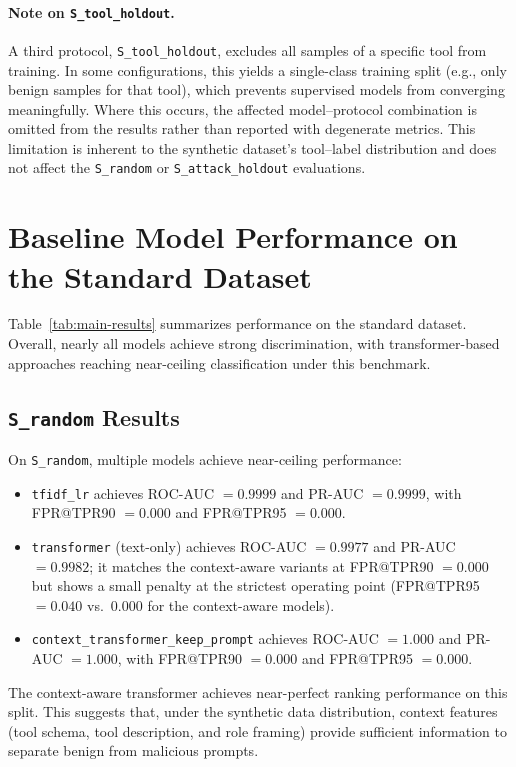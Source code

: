 \paragraph{Note on \texttt{S\_tool\_holdout}.}
A third protocol, \texttt{S\_tool\_holdout}, excludes all samples of a specific tool from training. In some configurations, this yields a single-class training split (e.g., only benign samples for that tool), which prevents supervised models from converging meaningfully. Where this occurs, the affected model--protocol combination is omitted from the results rather than reported with degenerate metrics. This limitation is inherent to the synthetic dataset's tool--label distribution and does not affect the \texttt{S\_random} or \texttt{S\_attack\_holdout} evaluations.

\section{Baseline Model Performance on the Standard Dataset}
\label{subsec:baseline_standard}

Table~\ref{tab:main-results} summarizes performance on the standard dataset. Overall, nearly all models achieve strong discrimination, with transformer-based approaches reaching near-ceiling classification under this benchmark.

\subsection{\texttt{S\_random} Results}

On \texttt{S\_random}, multiple models achieve near-ceiling performance:

\begin{itemize}
    \item \texttt{tfidf\_lr} achieves ROC-AUC $=0.9999$ and PR-AUC $=0.9999$, with FPR@TPR90 $=0.000$ and FPR@TPR95 $=0.000$.
    \item \texttt{transformer} (text-only) achieves ROC-AUC $=0.9977$ and PR-AUC $=0.9982$; it matches the context-aware variants at FPR@TPR90 $=0.000$ but shows a small penalty at the strictest operating point (FPR@TPR95 $=0.040$ vs.\ $0.000$ for the context-aware models).
    \item \texttt{context\_transformer\_keep\_prompt} achieves ROC-AUC $=1.000$ and PR-AUC $=1.000$, with FPR@TPR90 $=0.000$ and FPR@TPR95 $=0.000$.
\end{itemize}

The context-aware transformer achieves near-perfect ranking performance on this split. This suggests that, under the synthetic data distribution, context features (tool schema, tool description, and role framing) provide sufficient information to separate benign from malicious prompts.

